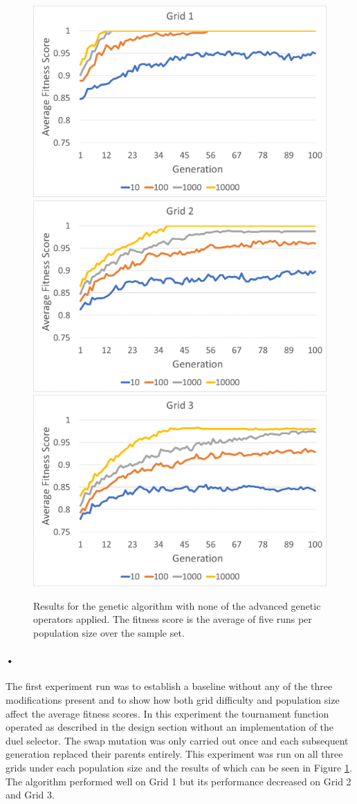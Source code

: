 \documentclass[10pt]{article}
\begin{document}
\begin{figure}[htp]

\centering
\includegraphics[width=.329\linewidth]{i/all_false_g1.png}\hfill
\includegraphics[width=.329\linewidth]{i/all_false_g2.png}\hfill
\includegraphics[width=.329\linewidth]{i/all_false_g3.png}

\caption{Results for the genetic algorithm with none of the advanced genetic operators applied. The fitness score is the average of five runs per population size over the sample set.}
\label{fig:all_false}

\end{figure}
\paragraph{•}

The first experiment run was to establish a baseline without any of the three modifications present and to show how both grid difficulty and population size affect the average fitness scores. In this experiment the tournament function operated as described in the design section without an implementation of the duel selector. The swap mutation was only carried out once and each subsequent generation replaced their parents entirely. This experiment was run on all three grids under each population size and the results of which can be seen in Figure \ref{fig:all_false}. The algorithm performed well on Grid 1 but its performance decreased on Grid 2 and Grid 3.
\end{document}
